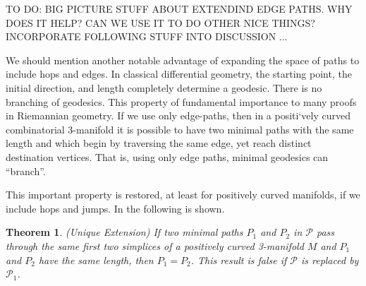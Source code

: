 \documentclass[12pt]{article}
\newtheorem{thm}{Theorem}[section]
\begin{document}
TO DO: BIG PICTURE STUFF ABOUT EXTENDIND EDGE PATHS. WHY DOES IT HELP? CAN WE USE IT TO DO OTHER NICE THINGS? INCORPORATE FOLLOWING STUFF INTO DISCUSSION ...

We should mention another notable advantage of expanding the space of paths to include hops and edges. In classical differential geometry, the starting point, the initial direction, and length completely determine a geodesic. There is no branching of geodesics. This property of fundamental importance to many proofs in Riemannian geometry. If we use only edge-paths, then in a positi`vely curved combinatorial 3-manifold it is possible to have two minimal paths with the same length and which begin by traversing the same edge, yet reach distinct destination vertices. That is, using only edge paths, minimal geodesics can ``branch''.

This important property is restored, at least for positively curved manifolds, if we include hops and jumps. In \cite{Trout10} the following is shown.

\begin{thm}(Unique Extension) If two minimal paths $P_1$ and $P_2$ in $\mathcal{P}$ pass through the same first two simplices of a positively curved 3-manifold $M$ and $P_1$ and $P_2$ have the same length, then $P_1 = P_2$. This result is false if $\mathcal{P}$ is replaced by $\mathcal{P}_1$.
\end{thm}



\end{document}
